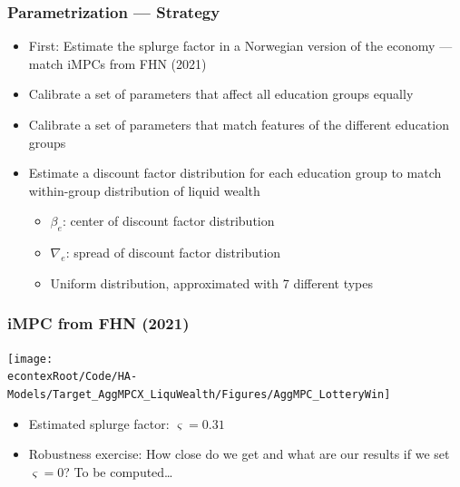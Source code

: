 \documentclass[pdflatex,aspectratio=169]{beamer}
\begin{document}
\begin{frame}
\frametitle{Parametrization --- Strategy}
\begin{itemize} 
\itemsep = \bigskipamount 
\item First: Estimate the splurge factor in a Norwegian version of the economy --- match iMPCs from FHN (2021)
\item Calibrate a set of parameters that affect all education groups equally 
\item Calibrate a set of parameters that match features of the different education groups 
\item Estimate a discount factor distribution for each education group to match within-group distribution of liquid wealth
	\begin{itemize}
	\itemsep = .25\bigskipamount 
	\item $\beta_e$: center of discount factor distribution
	\item $\nabla_e$: spread of discount factor distribution 
	\item Uniform distribution, approximated with 7 different types
	\end{itemize}
\end{itemize} 
\end{frame}

\begin{frame}
	\frametitle{iMPC from FHN (2021)}
	\centering 
	\texttt{[image: \\econtexRoot/Code/HA-Models/Target\_AggMPCX\_LiquWealth/Figures/AggMPC\_LotteryWin]}
	\begin{itemize}
		\itemsep = .5\bigskipamount 
		\item Estimated splurge factor: $\varsigma = 0.31$
		\item Robustness exercise: How close do we get and what are our results if we set $\varsigma = 0$? To be computed\ldots 
	\end{itemize}
\end{frame}
\end{document}
